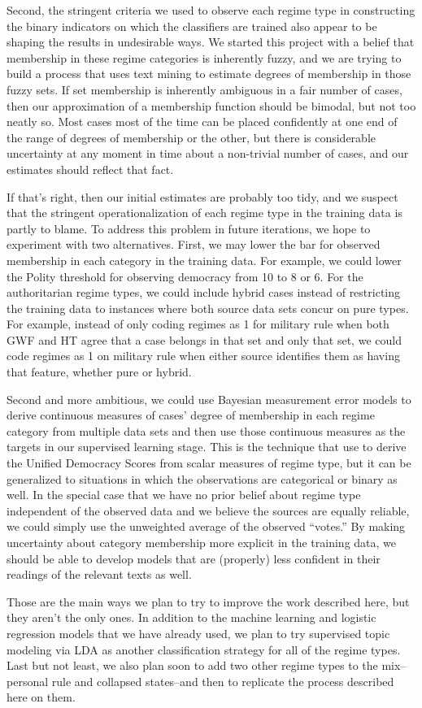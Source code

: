 \documentclass[pdftex,12pt,fullpage,oneside]{amsart}
\begin{document}
Second, the stringent criteria we used to observe each regime type in constructing the binary indicators on which the classifiers are trained also appear to be shaping the results in undesirable ways. We started this project with a belief that membership in these regime categories is inherently fuzzy, and we are trying to build a process that uses text mining to estimate degrees of membership in those fuzzy sets. If set membership is inherently ambiguous in a fair number of cases, then our approximation of a membership function should be bimodal, but not too neatly so. Most cases most of the time can be placed confidently at one end of the range of degrees of membership or the other, but there is considerable uncertainty at any moment in time about a non-trivial number of cases, and our estimates should reflect that fact.

If that's right, then our initial estimates are probably too tidy, and we suspect that the stringent operationalization of each regime type in the training data is partly to blame.  To address this problem in future iterations, we hope to experiment with two alternatives. First, we may lower the bar for observed membership in each category in the training data. For example, we could lower the Polity threshold for observing democracy from 10 to 8 or 6. For the authoritarian regime types, we could include hybrid cases instead of restricting the training data to instances where both source data sets concur on pure types. For example, instead of only coding regimes as 1 for military rule when both GWF and HT agree that a case belongs in that set and only that set, we could code regimes as 1 on military rule when either source identifies them as having that feature, whether pure or hybrid.

Second and more ambitious, we could use Bayesian measurement error models to derive continuous measures of cases' degree of membership in each regime category from multiple data sets and then use those continuous measures as the targets in our supervised learning stage. This is the technique that \citet{pemstein:etal:2010} use to derive the Unified Democracy Scores from scalar measures of regime type, but it can be generalized to situations in which the observations are categorical or binary as well. In the special case that we have no prior belief about regime type independent of the observed data and we believe the sources are equally reliable, we could simply use the unweighted average of the observed ``votes.'' By making uncertainty about category membership more explicit in the training data, we should be able to develop models that are (properly) less confident in their readings of the relevant texts as well.

Those are the main ways we plan to try to improve the work described here, but they aren't the only ones. In addition to the machine learning and logistic regression models that we have already used, we plan to try supervised topic modeling via LDA as another classification strategy for all of the regime types. Last but not least, we also plan soon to add two other regime types to the mix--personal rule and collapsed states--and then to replicate the process described here on them.



\end{document}
